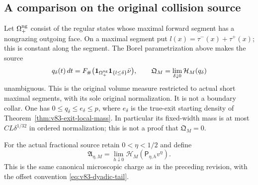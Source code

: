 \subsection{A comparison on the original collision source}
Let $\Omega_+^{\rm ng}$ consist of the regular states whose maximal
forward segment has a nongrazing outgoing face. On a maximal segment
put $l(x)=\tau^-(x)+\tau^+(x)$; this is constant along the segment.
The Borel parametrization above makes the source
\begin{equation}\label{eq:v85-tube-source}
 q_\delta(t)\,dt
   =F_\#\bigl(\one_{\Omega_+^{\rm ng}}\one_{\{l\le\delta\}}
                  \bar\nu\bigr),\qquad
 \mathfrak Q_M=\lim_{\delta\downarrow0}\mathcal H_M(q_\delta)
\end{equation}
unambiguous. This is the original volume measure restricted to actual
short maximal segments, with its sole original normalization. It is
not a boundary collar. One has $0\le q_\delta\le e_\delta\le p$,
where $e_\delta$ is the true-exit starting density of
Theorem~\ref{thm:v83-exit-local-mass}. In particular its fixed-width
mass is at most $CL\delta^{1/32}$ in ordered normalization; this
is not a proof that $\mathfrak Q_M=0$.

For the actual fractional source retain $0<\eta<1/2$ and define
\begin{equation}\label{eq:v85-volume-charge}
 \mathfrak A_{\eta,M}=\lim_{h\downarrow0}
                  \mathcal H_M(\mathsf P_{\eta,h}v^\eta).
\end{equation}
This is the same canonical microscopic charge as in the preceding
revision, with the offset convention \eqref{eq:v83-dyadic-tail}.

